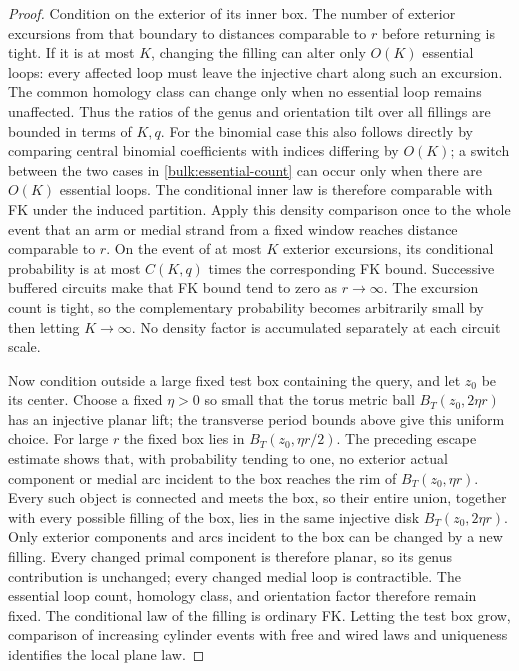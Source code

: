 \begin{proof}
Condition on the exterior of its inner box. The number of exterior
excursions from that boundary to distances comparable to $r$ before
returning is tight. If it is at most $K$, changing the filling
can alter only $O(K)$ essential loops: every affected loop must
leave the injective chart along such an excursion. The common
homology class can change only when no essential loop remains
unaffected. Thus the ratios of the genus and orientation tilt over
all fillings are bounded in terms of $K,q$. For the binomial case
this also follows directly by comparing central binomial
coefficients with indices differing by $O(K)$; a switch between
the two cases in \eqref{bulk:essential-count} can occur only when
there are $O(K)$ essential loops. The conditional inner law is
therefore comparable with FK under the induced partition.
Apply this density comparison once to the whole event that an arm or
medial strand from a fixed window reaches distance comparable to $r$.
On the event of at most $K$ exterior excursions, its conditional
probability is at most $C(K,q)$ times the corresponding FK bound.
Successive buffered circuits make that FK bound tend to zero as
$r\to\infty$. The excursion count is tight, so the complementary
probability becomes arbitrarily small by then letting $K\to\infty$.
No density factor is accumulated separately at each circuit scale.

Now condition outside a large fixed test box containing the query,
and let $z_0$ be its center. Choose a fixed $\eta>0$ so small that the
torus metric ball $B_T(z_0,2\eta r)$ has an injective planar lift;
the transverse period bounds above give this uniform choice. For large
$r$ the fixed box lies in $B_T(z_0,\eta r/2)$. The preceding escape
estimate shows that, with probability tending to one, no exterior
actual component or medial arc incident to the box reaches the rim of
$B_T(z_0,\eta r)$. Every such object is connected and meets the box,
so their entire union, together with every possible filling of the
box, lies in the same injective disk $B_T(z_0,2\eta r)$. Only exterior
components and arcs incident to the box can be changed by a new filling.
Every changed primal component is therefore planar, so its genus
contribution is unchanged; every changed medial loop is contractible.
The essential loop count, homology class, and orientation factor
therefore remain fixed. The conditional law of the filling is ordinary
FK. Letting the test box grow, comparison of increasing
cylinder events with free and wired laws and uniqueness identifies
the local plane law.


\end{proof}
